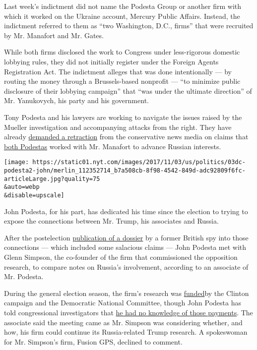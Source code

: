 Last week's indictment did not name the Podesta Group or another firm
with which it worked on the Ukraine account, Mercury Public Affairs.
Instead, the indictment referred to them as ``two Washington, D.C.,
firms'' that were recruited by Mr. Manafort and Mr. Gates.

While both firms disclosed the work to Congress under less-rigorous
domestic lobbying rules, they did not initially register under the
Foreign Agents Registration Act. The indictment alleges that was done
intentionally --- by routing the money through a Brussels-based
nonprofit --- ``to minimize public disclosure of their lobbying
campaign'' that ``was under the ultimate direction'' of Mr. Yanukovych,
his party and his government.

Tony Podesta and his lawyers are working to navigate the issues raised
by the Mueller investigation and accompanying attacks from the right.
They have already
\href{https://www.documentcloud.org/documents/4164203-Tony-Podesta-Cease-amp-Desist-to-Tucker-Carlson.html}{demanded
a retraction} from the conservative news media on claims that
\href{https://www.realclearpolitics.com/video/2017/10/25/tucker_carlson_source_podesta_brothers_and_manafort_not_trump_central_figures_in_mueller_probe.html}{both
Podestas} worked with Mr. Manafort to advance Russian interests.

\texttt{[image: https://static01.nyt.com/images/2017/11/03/us/politics/03dc-podesta2-john/merlin\_112352714\_b7a508cb-8f98-4542-849d-adc92809f6fc-articleLarge.jpg?quality=75\\\&auto=webp\\\&disable=upscale]}

John Podesta, for his part, has dedicated his time since the election to
trying to expose the connections between Mr. Trump, his associates and
Russia.

After the postelection
\href{https://www.nytimes.com/2017/01/11/us/politics/donald-trump-russia-intelligence.html}{publication
of a dossier} by a former British spy into those connections --- which
included some salacious claims --- John Podesta met with Glenn Simpson,
the co-founder of the firm that commissioned the opposition research, to
compare notes on Russia's involvement, according to an associate of Mr.
Podesta.

During the general election season, the firm's research was
\href{https://www.nytimes.com/2017/10/24/us/politics/clinton-dnc-russia-dossier.html}{funded}by
the Clinton campaign and the Democratic National Committee, though John
Podesta has told congressional investigators that
\href{http://www.cnn.com/2017/10/26/politics/john-podesta-debbie-wasserman-schultz-trump-dossier/index.html}{he
had no knowledge of those payments}. The associate said the meeting came
as Mr. Simpson was considering whether, and how, his firm could continue
its Russia-related Trump research. A spokeswoman for Mr. Simpson's firm,
Fusion GPS, declined to comment.

